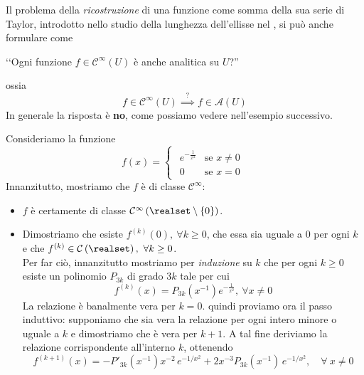 Il problema della \textit{ricostruzione} di una funzione come somma della sua serie di Taylor, introdotto nello studio della lunghezza dell'ellisse nel , si può anche formulare come
\begin{center}
	‘‘Ogni funzione $f\in\mathcal{C}^{\infty}\left(U\right)$ è anche analitica su $U$?''
\end{center}
ossia
\begin{equation*}
	f\in\mathcal{C}^{\infty}\left(U\right)\stackrel{?}{\implies}f\in\mathcal{A}\left(U\right)
\end{equation*}
In generale la risposta è \textbf{no}, come possiamo vedere nell'esempio successivo.
\begin{examplewt}
Consideriamo la funzione
	\begin{equation*}
		f(x)=
		\begin{cases}
			\begin{array}{ll}
				e^{-\frac{1}{x^2}}&\text{se }x\neq 0\\
				0&\text{se }x=0
			\end{array}
		\end{cases}
	\end{equation*}
Innanzitutto, mostriamo che $f$ è di classe  $\mathcal{C}^{\infty}$:
\begin{itemize}
	\item $f$ è certamente di classe $\mathcal{C}^{\infty}\left(\realset\setminus\left\{0\right\}\right)$.
	\item Dimostriamo che esiste $f^{\left(k\right)}\left(0\right),\ \forall k\geq 0$, che essa sia uguale a $0$ per ogni $k$ e che $f^{\left(k\right)}\in\mathcal{C}\left(\realset\right),\ \forall k\geq 0$.\\
	Per far ciò, innanzitutto mostriamo per \textit{induzione} su $k$ che per ogni $k\geq 0$ esiste un polinomio $P_{3k}$ di grado $3k$ tale per cui
	\begin{equation*}
		f^{(k)}(x)=P_{3k}\left(x^{-1}\right)e^{-\frac{1}{x^2}},\ \forall x\neq 0
	\end{equation*}
La relazione è banalmente vera per $k=0$. quindi proviamo ora il passo induttivo: supponiamo che sia vera la relazione per ogni intero minore o uguale a $k$ e dimostriamo che è vera per $k+1$. A tal fine deriviamo la relazione corrispondente all'interno $k$, ottenendo
\begin{equation*}
	f^{(k+1)}(x)=-P'_{3k}(x^{-1})x^{-2}\, e^{-1/x^2}+2x^{-3} P_{3k}(x^{-1})\, e^{-1/x^2},\quad \forall \ x\neq 0

\end{equation*}
\end{itemize}
\end{examplewt}
